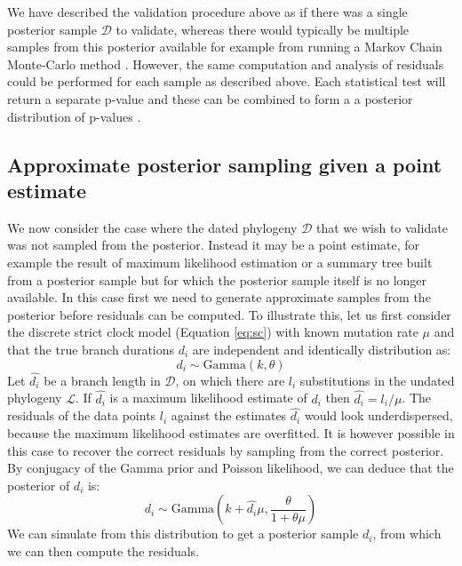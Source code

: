 \documentclass{article}
\begin{document}
We have described the validation procedure above as if there was a single posterior
sample $\mathcal{D}$ to validate, whereas there would typically be multiple samples
from this posterior available for example from running a Markov Chain Monte-Carlo
method \citep{Didelot2018}. However, the same computation and analysis of residuals
could be performed for each sample as described above. Each statistical test will
return a separate p-value and these can be combined to form a 
a posterior distribution of p-values \citep{streftarisNonexponentialToleranceInfection2012,lauNewModelDiagnostics2014,gibsonComparisonAssessmentEpidemic2018}.

\subsection*{Approximate posterior sampling given a point estimate}

We now consider the case where the dated phylogeny $\mathcal{D}$ that we wish
to validate was not sampled from the posterior. Instead it may be a point estimate, 
for example the result of maximum likelihood estimation
or a summary tree built from a posterior sample \citep{heledLookingTreesForest2013}
but for which the posterior sample itself is no longer available.
In this case first we need to generate approximate 
samples from the posterior before residuals can be computed.
To illustrate this, let us first consider the discrete strict clock model (Equation \ref{eq:sc})
with known mutation rate $\mu$
and that the true branch durations $d_i$ are independent and identically
distribution as:
\begin{equation}
d_i \sim \mathrm{Gamma}(k,\theta)
\end{equation}
Let $\hat{d_i}$ be a branch length in $\mathcal{D}$, on which there are $l_i$ substitutions in the undated phylogeny $\mathcal{L}$. If $\hat{d_i}$ is a maximum likelihood estimate of $d_i$ then
$\hat{d_i}=l_i/\mu$.
The residuals of the data points $l_i$ against the estimates $\hat{d_i}$ would look
underdispersed, because the maximum likelihood estimates are overfitted.
It is however possible in this case to recover the correct residuals by sampling from
the correct posterior. 
By conjugacy of the Gamma prior and Poisson likelihood, we can deduce that the posterior of $d_i$ is:
\begin{equation}
d_i \sim \mathrm{Gamma}\left(k+\hat{d_i} \mu,\frac{\theta}{1+\theta \mu}\right)
\end{equation}
We can simulate from this distribution to get a posterior sample $d_i$, from which we can then compute the residuals.
\end{document}
